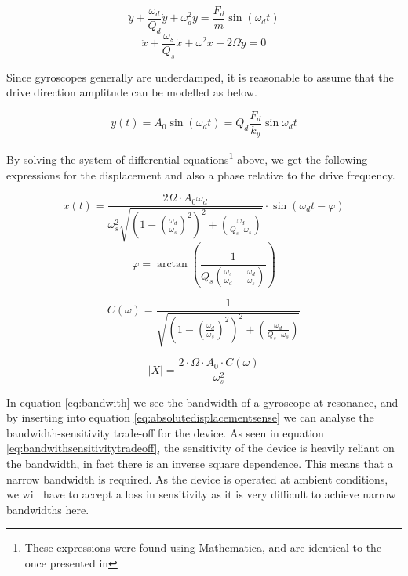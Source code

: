 \documentclass[12pt,a4paper,titlepage]{article}
\begin{document}
\begin{spacing}{1.1}
\begin{equation}
\ddot{y}+\dfrac{\omega_d}{Q_d} \dot{y} + \omega_d^2 y = \dfrac{F_d}{m} \sin(\omega_d t)
\label{eq:motiondrivedirection}
\end{equation}
\begin{equation}
\ddot{x} + \dfrac{\omega_s}{Q_s} \dot{x} + \omega^2 x + 2 \Omega \dot{y} = 0
\label{eq:motionsensedirection}
\end{equation}

Since gyroscopes generally are underdamped, it is reasonable to assume that the drive direction amplitude can be modelled as below.

\begin{equation}
y(t) = A_0 \sin(\omega_d t) = Q_d \dfrac{F_d}{k_y} \sin{\omega_d t}
\label{eq:yamplitudeast}
\end{equation}

By solving the system of differential equations\footnote{These expressions were found using Mathematica, and are identical to the once presented in %
} 
above, we get the following expressions for the displacement and also a phase relative to the drive frequency.

\begin{equation}
x(t) = \dfrac{2 \Omega \cdot A_0 \omega_d}{\omega_s^2 \sqrt{\left(1-\left(\frac{\omega_d}{\omega_s}\right)^2\right)^2 + \left(\frac{\omega_d}{Q_s\cdot \omega_s}\right)}} \cdot \sin(\omega_d t - \varphi)
\label{eq:xoftraw}
\end{equation}
\begin{equation}
\varphi = \arctan \left(\dfrac{1}{Q_s \left(\frac{\omega_s}{\omega_d}- \frac{\omega_d}{\omega_s}\right)}\right)
\label{eq:phase}
\end{equation}

\begin{equation}
C(\omega) = \dfrac{1}{ \sqrt{\left(1-\left(\frac{\omega_d}{\omega_s}\right)^2\right)^2 + \left(\frac{\omega_d}{Q_s\cdot \omega_s}\right)}}
\label{eq:constant}
\end{equation}

\begin{equation}
\lvert X \rvert = \dfrac{2 \cdot \Omega \cdot A_0 \cdot C (\omega)}{\omega_s^2}
\label{eq:absolutedisplacementsense}
\end{equation}

In equation \ref{eq:bandwith} we see the bandwidth of a gyroscope at resonance, and by inserting into equation  \ref{eq:absolutedisplacementsense} we can analyse the bandwidth-sensitivity trade-off for the device. As seen in equation \ref{eq:bandwithsensitivitytradeoff}, the sensitivity of the device is heavily reliant on the bandwidth, in fact there is an inverse square dependence. This means that a narrow bandwidth is required. As the device is operated at ambient conditions, we will have to accept a loss in sensitivity as it is very difficult to achieve narrow bandwidths here.


\end{spacing}
\end{document}
